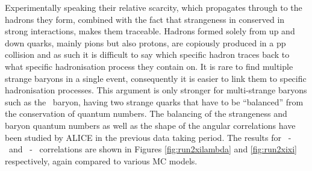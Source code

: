     Experimentally speaking their relative scarcity, which propagates through to the hadrons they form, combined with the fact that strangeness in conserved in strong interactions, makes them traceable. Hadrons formed solely from up and down quarks, mainly pions but also protons, are copiously produced in a pp collision and as such it is difficult to say which specific hadron traces back to what specific hadronisation process  they contain on. It is rare to find multiple strange baryons in a single event, consequently it is easier to link them to specific hadronisation processes. This argument is only stronger for multi-strange baryons such as the \Xi\ baryon, having two strange quarks that have to be ``balanced'' from the conservation of quantum numbers. The balancing of the strangeness and baryon quantum numbers as well as the shape of the angular correlations have been studied by ALICE in the previous data taking period. \cite{Adolfson2024} The results for \Xi\ - \Lambda\ and \Xi\ - \Xi\ correlations are shown in Figures \ref{fig:run2xilambda} and \ref{fig:run2xixi} respectively, again compared to various MC models. 


